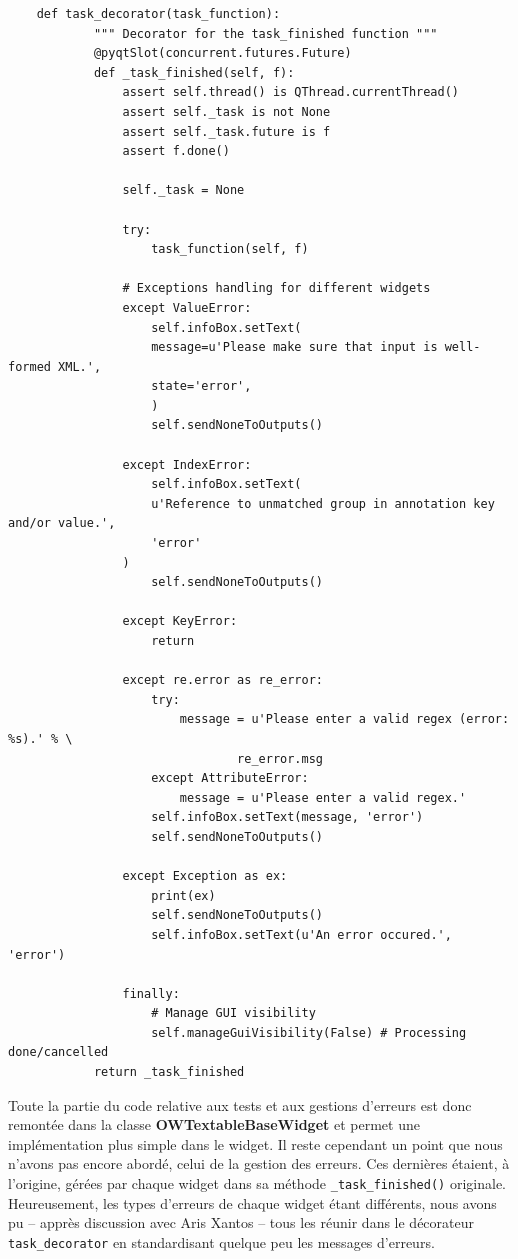 \documentclass{article}
\begin{document}
\begin{verbatim}
    def task_decorator(task_function):
            """ Decorator for the task_finished function """
            @pyqtSlot(concurrent.futures.Future)
            def _task_finished(self, f):
                assert self.thread() is QThread.currentThread()
                assert self._task is not None
                assert self._task.future is f
                assert f.done()

                self._task = None
                
                try:
                    task_function(self, f)
                
                # Exceptions handling for different widgets
                except ValueError:
                    self.infoBox.setText(
                    message=u'Please make sure that input is well-formed XML.',
                    state='error',
                    )
                    self.sendNoneToOutputs()
                    
                except IndexError:
                    self.infoBox.setText(
                    u'Reference to unmatched group in annotation key and/or value.',
                    'error'
                )
                    self.sendNoneToOutputs()

                except KeyError:
                    return
                
                except re.error as re_error:
                    try:
                        message = u'Please enter a valid regex (error: %s).' % \
                                re_error.msg
                    except AttributeError:
                        message = u'Please enter a valid regex.'
                    self.infoBox.setText(message, 'error')
                    self.sendNoneToOutputs()

                except Exception as ex:
                    print(ex)
                    self.sendNoneToOutputs()
                    self.infoBox.setText(u'An error occured.', 'error')

                finally:
                    # Manage GUI visibility
                    self.manageGuiVisibility(False) # Processing done/cancelled
            return _task_finished
\end{verbatim}

Toute la partie du code relative aux tests et aux gestions d'erreurs est donc remontée dans la classe \textbf{OWTextableBaseWidget} et permet une implémentation plus simple dans le widget.
\newline
Il reste cependant un point que nous n'avons pas encore abordé, celui de la gestion des erreurs. Ces dernières étaient, à l'origine, gérées par chaque widget dans sa méthode \texttt{\_task\_finished()} originale. Heureusement, les types d'erreurs de chaque widget étant différents, nous avons pu – apprès discussion avec Aris Xantos – tous les réunir dans le décorateur \texttt{task\_decorator} en standardisant quelque peu les messages d'erreurs.
\end{document}
